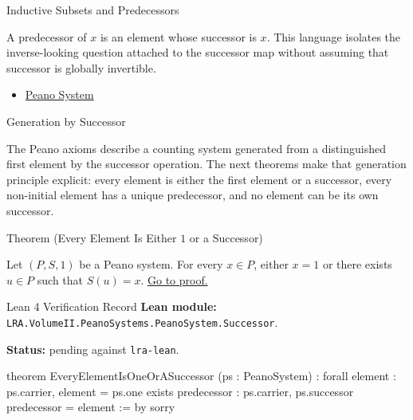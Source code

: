 \begin{topicbox}{Inductive Subsets and Predecessors}
\begin{remark*}[Interpretation]
A predecessor of $x$ is an element whose successor is $x$. This language
isolates the inverse-looking question attached to the successor map without
assuming that successor is globally invertible.
\end{remark*}

\begin{dependencies}
\begin{itemize}
  \item \hyperref[def:peano-system]{Peano System}
\end{itemize}
\end{dependencies}
\end{topicbox}

\begin{topicbox}{Generation by Successor}
\begin{exposition}
The Peano axioms describe a counting system generated from a distinguished
first element by the successor operation. The next theorems make that
generation principle explicit: every element is either the first element or a
successor, every non-initial element has a unique predecessor, and no element
can be its own successor.
\end{exposition}

\begin{theorembox}{Theorem (Every Element Is Either \texorpdfstring{$1$}{1} or a Successor)}
\begin{theorem}
\label{thm:every-element-is-one-or-a-successor}
Let $(P,S,1)$ be a Peano system. For every $x \in P$, either $x=1$ or there
exists $u \in P$ such that $S(u)=x$.
\hyperref[prf:every-element-is-one-or-a-successor]{Go to proof.}
\end{theorem}
\end{theorembox}

\begin{formalizationrecord}{Lean 4 Verification Record}
\textbf{Lean module:} \texttt{LRA.VolumeII.PeanoSystems.PeanoSystem.Successor}.\par
{}
\textbf{Status:} pending against \texttt{lra-lean}.\par

\begin{leancode}
theorem EveryElementIsOneOrASuccessor
    (ps : PeanoSystem) :
    forall element : ps.carrier,
      element = ps.one \/
        exists predecessor : ps.carrier,
          ps.successor predecessor = element := by
  sorry
\end{leancode}
\end{formalizationrecord}


\end{topicbox}
